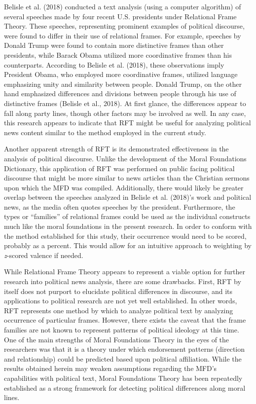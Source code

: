 \documentclass[english,,man]{apa6}
\begin{document}
Belisle et al. (2018) conducted a text analysis (using a computer algorithm) of several speeches made by four recent U.S. presidents under Relational Frame Theory. These speeches, representing prominent examples of political discourse, were found to differ in their use of relational frames. For example, speeches by Donald Trump were found to contain more distinctive frames than other presidents, while Barack Obama utilized more coordinative frames than his counterparts. According to Belisle et al. (2018), these observations imply President Obama, who employed more coordinative frames, utilized language emphasizing unity and similarity between people. Donald Trump, on the other hand emphasized differences and divisions between people through his use of distinctive frames (Belisle et al., 2018). At first glance, the differences appear to fall along party lines, though other factors may be involved as well. In any case, this research appears to indicate that RFT might be useful for analyzing political news content similar to the method employed in the current study.

Another apparent strength of RFT is its demonstrated effectiveness in the analysis of political discourse. Unlike the development of the Moral Foundations Dictionary, this application of RFT was performed on public facing political discourse that might be more similar to news articles than the Christian sermons upon which the MFD was compiled. Additionally, there would likely be greater overlap between the speeches analyzed in Belisle et al. (2018)'s work and political news, as the media often quotes speeches by the president. Furthermore, the types or \enquote{families} of relational frames could be used as the individual constructs much like the moral foundations in the present research. In order to conform with the method established for this study, their occurrence would need to be scored, probably as a percent. This would allow for an intuitive approach to weighting by \emph{z}-scored valence if needed.

While Relational Frame Theory appears to represent a viable option for further research into political news analysis, there are some drawbacks. First, RFT by itself does not purport to elucidate political differences in discourse, and its applications to political research are not yet well established. In other words, RFT represents one method by which to analyze political text by analyzing occurrence of particular frames. However, there exists the caveat that the frame families are not known to represent patterns of political ideology at this time. One of the main strengths of Moral Foundations Theory in the eyes of the researchers was that it is a theory under which endorsement patterns (direction and relationship) could be predicted based upon political affiliation. While the results obtained herein may weaken assumptions regarding the MFD's capabilities with political text, Moral Foundations Theory has been repeatedly established as a strong framework for detecting political differences along moral lines.
\end{document}

